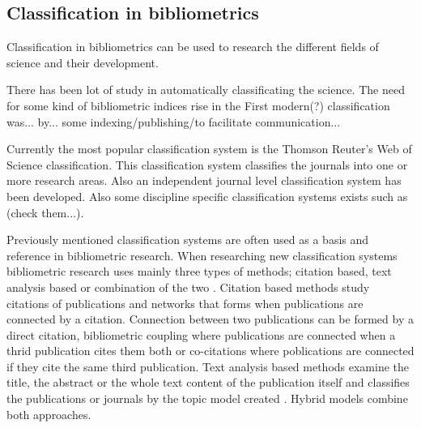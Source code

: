 \subsection{Classification in bibliometrics}
Classification in bibliometrics can be used to research the 
different fields of science and their development.

There has been lot of study in automatically classificating the 
science. 
The need for some kind of bibliometric indices rise in the 
First modern(?) classification was... by... some 
indexing/publishing/to facilitate communication...

Currently the most popular classification system is the Thomson 
Reuter's Web of Science classification. This classification 
system classifies the journals into one or more research areas. 
\cite{waltman_new_2012} 
Also an independent journal level classification system has been 
developed. \cite{archambault_towards_2011}
Also some discipline specific classification systems exists such 
as (check them...).

Previously mentioned classification systems are often used as a 
basis and reference in bibliometric research. When 
researching new classification systems bibliometric research 
uses mainly three types of methods; citation based, text analysis 
based or combination of the two \cite{janssens_hybrid_2009}.
Citation based methods study citations of publications and 
networks that forms when publications are connected by a 
citation. Connection between two publications can be 
formed by a direct citation, bibliometric coupling where 
publications are connected when a thrid publication cites them 
both or co-citations where poblications are connected if they 
cite the same third publication.
Text analysis based methods examine the title, the abstract or 
the whole text content of the publication itself and classifies 
the publications or journals by the topic model created 
\cite{blei_latent_2003}.
Hybrid models combine both approaches.

